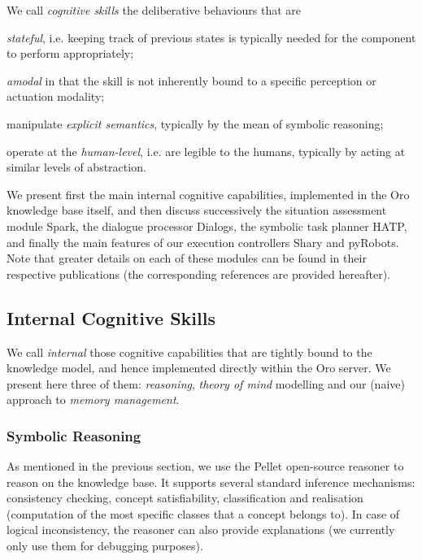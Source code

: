 \documentclass[preprint,3p,times]{elsarticle}
\newcommand{\ie}{i.e.\xspace}
\begin{document}
\begin{inparaenum} We call \emph{cognitive skills} the
deliberative behaviours that are \item \emph{stateful}, \ie keeping track of
previous states is typically needed for the component to perform appropriately;
\item \emph{amodal} in that the skill is not inherently bound to a specific
perception or actuation modality; \item manipulate \emph{explicit semantics},
typically by the mean of symbolic reasoning; \item operate at the
    \emph{human-level}, \ie are legible to the humans, typically by acting at
similar levels of abstraction.\end{inparaenum}

We present first the main internal cognitive capabilities, implemented in
the {\sc Oro} knowledge base itself, and then discuss successively the situation
assessment module {\sc Spark}, the dialogue processor {\sc Dialogs}, the
symbolic task planner HATP, and finally the main features of our execution
controllers {\sc Shary} and {\sc pyRobots}. Note that greater details on each of
these modules can be found in their respective publications (the corresponding
references are provided hereafter).

\subsection{Internal Cognitive Skills}
\label{sect|intern}

We call \emph{internal} those cognitive capabilities that are tightly bound to
the knowledge model, and hence implemented directly within the {\sc Oro} server.
We present here three of them: \emph{reasoning}, \emph{theory of mind} modelling
and our (naive) approach to \emph{memory management}.

\subsubsection{Symbolic Reasoning}
\label{reasoning}

As mentioned in the previous section, we use the {\sc Pellet} open-source reasoner to
reason on the knowledge base. It supports several standard inference mechanisms:
consistency checking, concept satisfiability, classification and realisation
(computation of the most specific classes that a concept belongs to). In
case of logical inconsistency, the reasoner can also provide explanations (we
currently only use them for debugging purposes).
\end{document}
